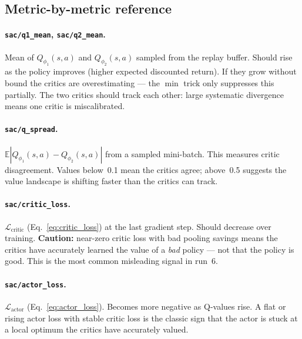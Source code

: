 \documentclass[11pt]{article}
\begin{document}
\subsection*{Metric-by-metric reference}

\paragraph{\texttt{sac/q1\_mean}, \texttt{sac/q2\_mean}.}
Mean of $Q_{\phi_1}(s,a)$ and $Q_{\phi_2}(s,a)$ sampled from the replay buffer.
Should rise as the policy improves (higher expected discounted return).
If they grow without bound the critics are overestimating --- the $\min$ trick
only suppresses this partially.
The two critics should track each other: large systematic divergence means one
critic is miscalibrated.

\paragraph{\texttt{sac/q\_spread}.}
$\mathbb{E}|Q_{\phi_1}(s,a) - Q_{\phi_2}(s,a)|$ from a sampled mini-batch.
This measures critic disagreement.
Values below~0.1 mean the critics agree; above~0.5 suggests the value landscape
is shifting faster than the critics can track.

\paragraph{\texttt{sac/critic\_loss}.}
$\mathcal{L}_{\text{critic}}$ (Eq.~\ref{eq:critic_loss}) at the last gradient step.
Should decrease over training.
\textbf{Caution:} near-zero critic loss with bad pooling savings means
the critics have accurately learned the value of a \emph{bad} policy ---
not that the policy is good.
This is the most common misleading signal in run~6.

\paragraph{\texttt{sac/actor\_loss}.}
$\mathcal{L}_{\text{actor}}$ (Eq.~\ref{eq:actor_loss}).
Becomes more negative as Q-values rise.
A flat or rising actor loss with stable critic loss is the classic sign that
the actor is stuck at a local optimum the critics have accurately valued.
\end{document}
